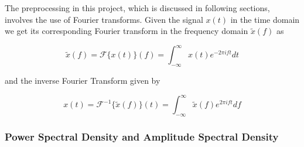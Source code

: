 \documentclass[12pt]{article}
\begin{document}
\medskip
\noindent The preprocessing in this project, which is discussed in following sections, involves the use of Fourier transforms. Given the signal $x(t)$ in the time domain we get its corresponding Fourier transform in the frequency domain $\tilde{x}(f)$ as

\begin{equation}
    \tilde{x}(f) = \mathcal{F}\{ x(t) \} (f) = \int_{-\infty}^{\infty} x(t) e^{-2 \pi i f t} dt
    \label{eq:fourier_transform}
\end{equation}

\medskip
\noindent and the inverse Fourier Transform given by

\begin{equation}
  x(t) = \mathcal{F}^{-1} \{ \tilde{x}(f) \} (t) = \int_{-\infty}^{\infty} \tilde{x}(f) e^{2 \pi i f t} df
  \label{eq:inverse_fourier_transform}
\end{equation}

\subsubsection{Power Spectral Density and Amplitude Spectral Density}\label{PSD_ASD}




\end{document}
